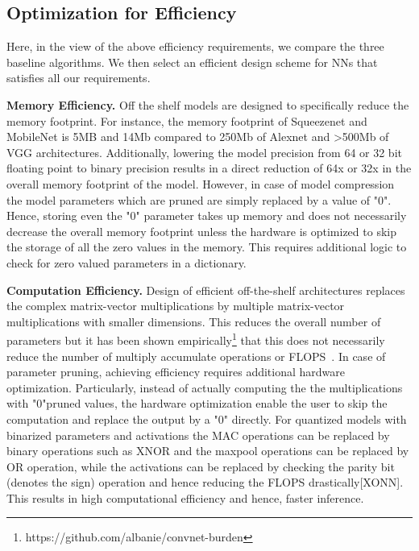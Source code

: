 \subsection{Optimization for Efficiency}

Here, in the view of the above efficiency requirements, we compare the three baseline algorithms.
We then select an efficient design scheme for NNs that satisfies all our requirements.


\noindent\textbf{Memory Efficiency.} Off the shelf models are designed to specifically reduce the memory footprint.
For instance, the memory footprint of Squeezenet and MobileNet is 5MB and 14Mb compared to 250Mb of Alexnet and >500Mb of VGG architectures.
Additionally, lowering the model precision from 64 or 32 bit floating point to binary precision results in a direct reduction of 64x or 32x in the overall memory footprint of the model.
However, in case of model compression the model parameters which are pruned are simply replaced by a value of "0".
Hence, storing even the "0" parameter takes up memory and does not necessarily decrease the overall memory footprint unless the hardware is optimized to skip the storage of all the zero values in the memory.
This requires additional logic to check for zero valued parameters in a dictionary.





\noindent\textbf{Computation Efficiency.} Design of efficient off-the-shelf architectures replaces the complex matrix-vector multiplications by multiple matrix-vector multiplications with smaller dimensions.
This reduces the overall number of parameters but it has been shown empirically\footnote{https://github.com/albanie/convnet-burden} that this does not necessarily reduce the number of multiply accumulate operations or FLOPS~\cite{article}.
In case of parameter pruning, achieving efficiency requires additional hardware optimization. Particularly, instead of actually computing the the multiplications with "0"pruned values, the hardware optimization enable the user to skip the computation and replace the output by a "0" directly.
For quantized models with binarized parameters and activations the MAC operations can be replaced by binary operations such as XNOR and the maxpool operations can be replaced by OR operation, while the activations can be replaced by checking the parity bit (denotes the sign) operation and hence reducing the FLOPS drastically[XONN].
This results in high computational efficiency and hence, faster inference.


